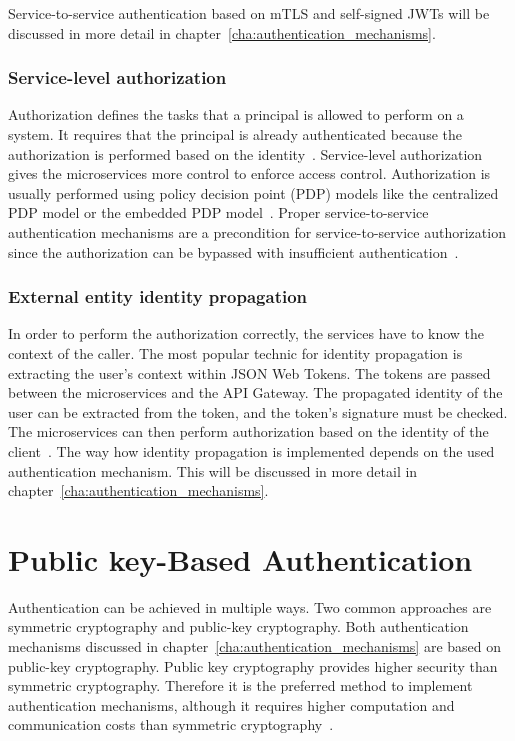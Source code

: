 Service-to-service authentication based on mTLS and self-signed JWTs will be discussed in more detail in chapter~\ref{cha:authentication_mechanisms}.

\subsubsection{Service-level authorization} 
\label{sec:service-level-authorization}
Authorization defines the tasks that a principal is allowed to perform on a system.
It requires that the principal is already authenticated because the authorization is performed based on the identity~\cite{siriwardena2014advanced}. 
Service-level authorization gives the microservices more control to enforce access control.
Authorization is usually performed using policy decision point (PDP) models like the centralized PDP model or the embedded PDP model~\cite{dias2020microservices, barabanov2020authentication}.
Proper service-to-service authentication mechanisms are a precondition for service-to-service authorization since the authorization can be bypassed with insufficient authentication~\cite{siriwardena2014advanced}.

\subsubsection{External entity identity propagation} 
\label{sec:external-entity-identity-propagation}
In order to perform the authorization correctly, the services have to know the context of the caller.
The most popular technic for identity propagation is extracting the user's context within JSON Web Tokens.
The tokens are passed between the microservices and the API Gateway.
The propagated identity of the user can be extracted from the token, and the token's signature must be checked.
The microservices can then perform authorization based on the identity of the client~\cite{barabanov2020authentication, dias2020microservices}.
The way how identity propagation is implemented depends on the used authentication mechanism.
This will be discussed in more detail in chapter~\ref{cha:authentication_mechanisms}.

\section{Public key-Based Authentication}
Authentication can be achieved in multiple ways.
Two common approaches are symmetric cryptography and public-key cryptography.
Both authentication mechanisms discussed in chapter~\ref{cha:authentication_mechanisms} are based on public-key cryptography.
Public key cryptography provides higher security than symmetric cryptography.
Therefore it is the preferred method to implement authentication mechanisms, although it requires higher computation and communication costs than symmetric cryptography~\cite{pubkeycrypto}.

